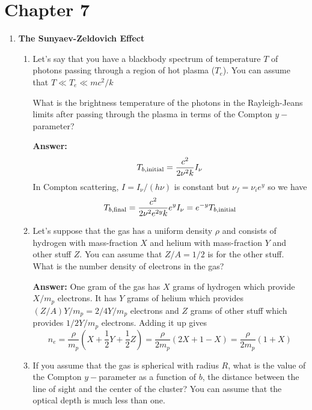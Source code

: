 \documentclass{article}
\newcommand{\rmscr}[1]{{\hbox{\rm \scriptsize #1}}}
\begin{document}
\fi
\section{Chapter 7}

\begin{enumerate}
\item{ \bf The Sunyaev-Zeldovich Effect}
\begin{enumerate}
\item Let's say that you have a blackbody spectrum of temperature $T$
  of photons passing through a region of hot plasma ($T_e$).   You can assume
  that $T \ll T_e \ll m c^2/k$ 

  What is the brightness temperature of the photons in the
  Rayleigh-Jeans limits after passing through the plasma in terms of
  the Compton $y-$parameter?

{\bf Answer:}
\begin{equation}
T_{b,\rmscr{initial}} = \frac{c^2}{2\nu^2 k } I_\nu
\end{equation}
In Compton scattering, $I = I_\nu/(h\nu)$ is constant but $\nu_f = \nu_i e^y$ so
we have
\begin{equation}
T_{b,\rmscr{final}} = \frac{c^2}{2\nu^2 e^{2y} k } e^y I_\nu = e^{-y} T_{b,\rmscr{initial}}
\end{equation}

\item Let's suppose that the gas has a uniform density $\rho$ and
  consists of hydrogen with mass-fraction $X$ and helium with
  mass-fraction $Y$ and other stuff $Z$.  You can assume that
  $Z/A=1/2$ is for the other stuff.  What is the number density of
  electrons in the gas?

{\bf Answer:}
One gram of the gas has $X$ grams of hydrogen which provide $X/m_p$
  electrons.  It has $Y$ grams of helium which provides $(Z/A) Y/m_p=
  2/4 Y/m_p$ electrons and $Z$ grams of other stuff which provides
  $1/2 Y/m_p$ electrons.  Adding it up gives
\begin{equation}
n_e = \frac{\rho}{m_p} \left ( X + \frac{1}{2} Y + \frac{1}{2} Z
  \right ) = \frac{\rho}{2 m_p} \left ( 2 X + 1 - X \right ) =
  \frac{\rho}{2 m_p} (1 + X )
\end{equation}
\item
  If you assume that the gas is spherical with radius $R$, what is the
  value of the Compton $y-$parameter as a function of $b$, the
  distance between the line of sight and the center of the cluster?
  You can assume that the optical depth is much less than one.


\end{enumerate}
\end{enumerate}
\end{document}
